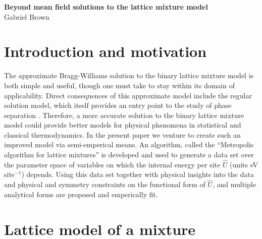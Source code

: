 \documentclass[10pt]{article}
\begin{document}
\begin{center}
    \textbf{\large Beyond mean field solutions to the lattice mixture model} \\
    Gabriel Brown
\end{center}


\section{Introduction and motivation}
The approximate Bragg-Williams solution to the binary lattice mixture model is both simple and useful, though one must take to stay within its domain of applicability.
Direct consequences of this approximate model include the regular solution model, which itself provides an entry point to the study of phase separation \cite{dill}.
Therefore, a more accurate solution to the binary lattice mixture model could provide better models for physical phenomena in statistical and classical thermodynamics.
In the present paper we venture to create such an improved model via semi-emperical means.
An algorithm, called the ``Metropolis algorithm for lattice mixtures'' is developed and used to generate a data set over the parameter space of variables on which the internal energy per site $\hat{U}$ (units eV site$^{-1}$) depends.
Using this data set together with physical insights into the data and physical and symmetry constraints on the functional form of $\hat{U}$, and multiple analytical forms are proposed and emperically fit.


\section{Lattice model of a mixture} 
\end{document}
